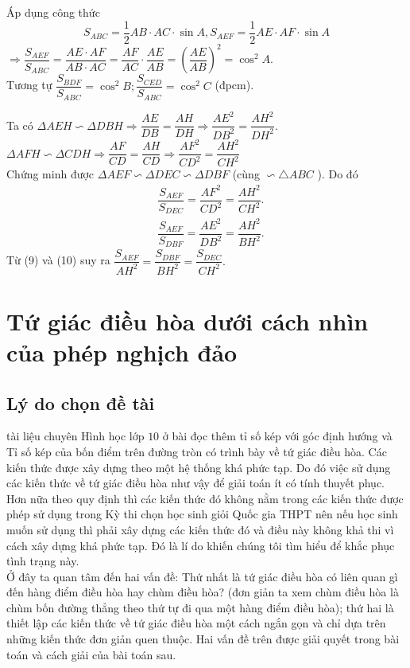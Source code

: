\begin{bt}
{\begin{listEX}
\item Áp dụng công thức $$S_{ABC} =\dfrac{1}{2}AB\cdot AC \cdot \sin A, S_{AEF} =\dfrac{1}{2}AE\cdot AF\cdot \sin A  $$
$\Rightarrow \dfrac{S_{AEF}}{S_{ABC}} =\dfrac{AE\cdot AF}{AB\cdot AC}=\dfrac{AF}{AC}\cdot \dfrac{AE}{AB} =\left( \dfrac{AE}{AB}\right)^2 =\cos^2 A .$\\
Tương tự $ \dfrac{S_{BDF}}{S_{ABC}} =\cos^2B;\dfrac{S_{CED}}{S_{ABC}} =\cos^2C $ (đpcm).
\item Ta có $ \Delta AEH \backsim \Delta DBH \Rightarrow \dfrac{AE}{DB}=\dfrac{AH}{DH}\Rightarrow \dfrac{AE^2}{DB^2}=\dfrac{AH^2}{DH^2}.$\\
$ \Delta AFH \backsim \Delta CDH \Rightarrow \dfrac{AF}{CD}=\dfrac{AH}{CD}\Rightarrow \dfrac{AF^2}{CD^2}=\dfrac{AH^2}{CH^2}$\\
Chứng minh được $ \Delta AEF \backsim \Delta DEC \backsim \Delta DBF $ (cùng $ \backsim \triangle ABC $ ). Do đó
{\allowdisplaybreaks
\begin{align*}
&\dfrac{S_{AEF}}{S_{DEC}} =\dfrac{AF^2}{CD^2}=\dfrac{AH^2}{CH^2}.\tag{9}\\
&\dfrac{S_{AEF}}{S_{DBF}} =\dfrac{AE^2}{DB^2}=\dfrac{AH^2}{BH^2}.\tag{10}
\end{align*}}Từ (9) và (10) suy ra 
$ \dfrac{S_{AEF}}{AH^2}=\dfrac{S_{DBF}}{BH^2}=\dfrac{S_{DEC}}{CH^2}. $
\end{listEX}
}
\end{bt}

\setcounter{bt}{0}
\setcounter{bt}{0}
\section{Tứ giác điều hòa dưới cách nhìn của phép nghịch đảo}
\begin{center}
\textbf{\color{violet}{Nguyễn Phi Mãng\\
(GV THPT Chuyên Quốc Học Huế, Thừa Thiên Huế)}}
\end{center}
\subsection{Lý do chọn đề tài}
 tài liệu chuyên Hình học lớp $10$ ở bài đọc thêm tỉ số kép với góc định hướng và Tỉ số kép của bốn điểm trên đường tròn có trình bày về tứ giác điều hòa. Các kiến thức được xây dựng theo một hệ thống khá phức tạp. Do đó việc sử dụng các kiến thức về tứ giác điều hòa như vậy để giải toán ít có tính thuyết phục. Hơn nữa theo quy định thì các kiến thức đó không nằm trong các kiến thức được phép sử dụng trong Kỳ thi chọn học sinh giỏi Quốc gia THPT nên nếu học sinh muốn sử dụng thì phải xây dựng các kiến thức đó và điều này không khả thi vì cách xây dựng khá phức tạp. Đó là lí do khiến chúng tôi tìm hiểu để khắc phục tình trạng này.\\
Ở đây ta quan tâm đến hai vấn đề: Thứ nhất là tứ giác điều hòa có liên quan gì đến hàng điểm điều hòa hay chùm điều hòa? (đơn giản ta xem chùm điều hòa là chùm bốn đường thẳng theo thứ tự đi qua một hàng điểm điều hòa); thứ hai là thiết lập các kiến thức về tứ giác điều hòa một cách ngắn gọn và chỉ dựa trên những kiến thức đơn giản quen thuộc. Hai vấn đề trên được giải quyết trong bài toán và cách giải của bài toán sau.
